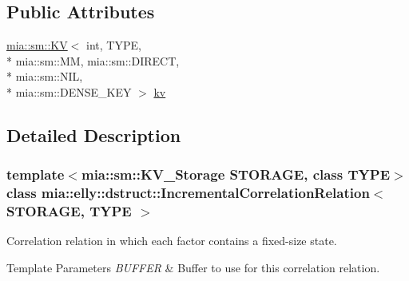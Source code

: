 \subsection*{Public Attributes}
\begin{DoxyCompactItemize}
\item 
\hyperlink{classmia_1_1sm_1_1_k_v}{mia\-::sm\-::\-K\-V}$<$ int, T\-Y\-P\-E, \\*
mia\-::sm\-::\-M\-M, mia\-::sm\-::\-D\-I\-R\-E\-C\-T, \\*
mia\-::sm\-::\-N\-I\-L, \\*
mia\-::sm\-::\-D\-E\-N\-S\-E\-\_\-\-K\-E\-Y $>$ \hyperlink{classmia_1_1elly_1_1dstruct_1_1_incremental_correlation_relation_a7724160f4b8b89f2d9ec00bd235a2123}{kv}
\end{DoxyCompactItemize}


\subsection{Detailed Description}
\subsubsection*{template$<$mia\-::sm\-::\-K\-V\-\_\-\-Storage S\-T\-O\-R\-A\-G\-E, class T\-Y\-P\-E$>$class mia\-::elly\-::dstruct\-::\-Incremental\-Correlation\-Relation$<$ S\-T\-O\-R\-A\-G\-E, T\-Y\-P\-E $>$}

Correlation relation in which each factor contains a fixed-\/size state. 


\begin{DoxyTemplParams}{Template Parameters}
{\em B\-U\-F\-F\-E\-R} & Buffer to use for this correlation relation. \\
\hline
\end{DoxyTemplParams}


